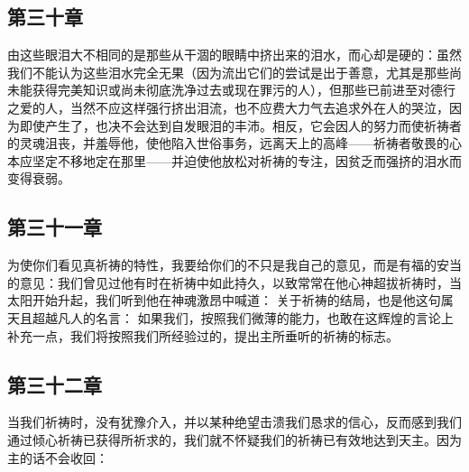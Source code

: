 
\subsection{第三十章}

\par

由这些眼泪大不相同的是那些从干涸的眼睛中挤出来的泪水，而心却是硬的：虽然我们不能认为这些泪水完全无果（因为流出它们的尝试是出于善意，尤其是那些尚未能获得完美知识或尚未彻底洗净过去或现在罪污的人），但那些已前进至对德行之爱的人，当然不应这样强行挤出泪流，也不应费大力气去追求外在人的哭泣，因为即使产生了，也决不会达到自发眼泪的丰沛。相反，它会因人的努力而使祈祷者的灵魂沮丧，并羞辱他，使他陷入世俗事务，远离天上的高峰——祈祷者敬畏的心本应坚定不移地定在那里——并迫使他放松对祈祷的专注，因贫乏而强挤的泪水而变得衰弱。\par


\subsection{第三十一章}

\par

为使你们看见真祈祷的特性，我要给你们的不只是我自己的意见，而是有福的安当的意见：我们曾见过他有时在祈祷中如此持久，以致常常在他心神超拔祈祷时，当太阳开始升起，我们听到他在神魂激昂中喊道： 关于祈祷的结局，也是他这句属天且超越凡人的名言： 如果我们，按照我们微薄的能力，也敢在这辉煌的言论上补充一点，我们将按照我们所经验过的，提出主所垂听的祈祷的标志。\par


\subsection{第三十二章}

\par

当我们祈祷时，没有犹豫介入，并以某种绝望击溃我们恳求的信心，反而感到我们通过倾心祈祷已获得所祈求的，我们就不怀疑我们的祈祷已有效地达到天主。因为主的话不会收回： \par

